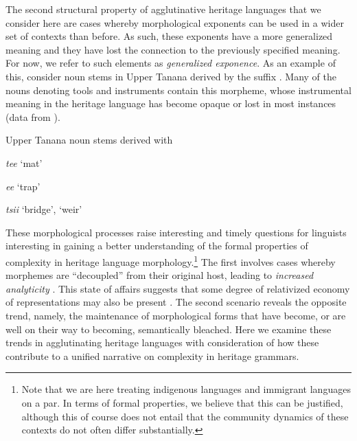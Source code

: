 \documentclass[output=paper,colorlinks,citecolor=brown,footheight=42pt]{langscibook}
\begin{document}
\noindent
The second structural property of agglutinative heritage languages that we consider here are cases whereby morphological exponents can be used in a wider set of contexts than before. As such, these exponents have a more generalized meaning and they have lost the connection to the previously specified meaning. For now, we refer to such elements as \textit{generalized exponence}. As an example of this, consider noun stems in Upper Tanana derived by the suffix \textit{\textltilde}. Many of the nouns denoting tools and instruments contain this morpheme, whose instrumental meaning in the heritage language has become opaque or lost in most instances (data from \citealt[148]{lovick2020}).

\begin{exe}

\ex \label{uppertanana} Upper Tanana noun stems derived with \textit{\textltilde}

\begin{xlist}

\item \textit{tee\textit\textltilde} `mat' 

\item \textit{ee\textit{\textltilde}} `trap' 

\item \textit{tsii\textit{\textltilde}} `bridge', `weir' 

\end{xlist}

\end{exe}

\begin{sloppypar}\noindent
These morphological processes raise interesting and timely questions for linguists interesting in gaining a better understanding of the formal properties of complexity in heritage language morphology.\footnote{Note that we are here treating indigenous languages and immigrant languages on a par. In terms of formal properties, we believe that this can be justified, although this of course does not entail that the community dynamics of these contexts do not often differ substantially.} The first involves cases whereby morphemes are ``decoupled” from their original host, leading to \textit{increased analyticity} \citep[183]{polinsky2018heritage}. This state of affairs suggests that some degree of relativized economy of representations may also be present \citep{scontras2015,ScontrasEtAl2018,perezc2019,PolinskyScontras2020,putnametal2021}. The second scenario reveals the opposite trend, namely, the maintenance of morphological forms that have become, or are well on their way to becoming, semantically bleached. Here we examine these trends in agglutinating heritage languages with consideration of how these contribute to a unified narrative on complexity in heritage grammars.
\end{sloppypar}
\end{document}
